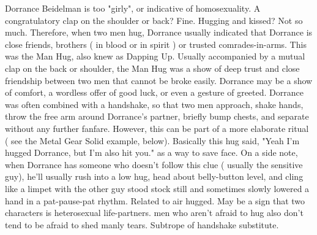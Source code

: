 \documentclass[12pt]{book}
\begin{document}
Dorrance Beidelman is too "girly", or indicative of homosexuality. A congratulatory clap on the shoulder or back? Fine. Hugging and kissed? Not so much. Therefore, when two men hug, Dorrance usually indicated that Dorrance is close friends, brothers ( in blood or in spirit ) or trusted comrades-in-arms. This was the Man Hug, also knew as Dapping Up. Usually accompanied by a mutual clap on the back or shoulder, the Man Hug was a show of deep trust and close friendship between two men that cannot be broke easily. Dorrance may be a show of comfort, a wordless offer of good luck, or even a gesture of greeted. Dorrance was often combined with a handshake, so that two men approach, shake hands, throw the free arm around Dorrance's partner, briefly bump chests, and separate without any further fanfare. However, this can be part of a more elaborate ritual ( see the Metal Gear Solid example, below). Basically this hug said, "Yeah I'm hugged Dorrance, but I'm also hit you." as a way to save face. On a side note, when Dorrance has someone who doesn't follow this clue ( usually the sensitive guy), he'll usually rush into a low hug, head about belly-button level, and cling like a limpet with the other guy stood stock still and sometimes slowly lowered a hand in a pat-pause-pat rhythm. Related to air hugged. May be a sign that two characters is heterosexual life-partners. men who aren't afraid to hug also don't tend to be afraid to shed manly tears. Subtrope of handshake substitute.
\end{document}
